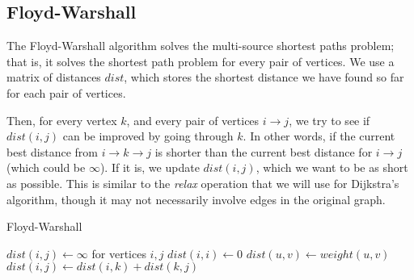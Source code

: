 \begin{center}
\end{center}


\subsection{Floyd-Warshall}

The Floyd-Warshall algorithm solves the multi-source shortest paths problem; that is, it solves the shortest path problem for every pair of vertices. We use a matrix of distances $dist$, which stores the shortest distance we have found so far for each pair of vertices.

Then, for every vertex $k$, and every pair of vertices $i \rightarrow j$, we try to see if $dist(i,j)$ can be improved by going through $k$. In other words, if the current best distance from $i \rightarrow k \rightarrow j$ is shorter than the current best distance for $i \rightarrow j$ (which could be $\infty$). If it is, we update $dist(i,j)$, which we want to be as short as possible. This is similar to the \textit{relax} operation that we will use for Dijkstra's algorithm, though it may not necessarily involve edges in the original graph.

\begin{algorithm}[H]
\caption{Floyd-Warshall}
\begin{algorithmic}
\State $dist(i, j) \gets \infty$ for vertices $i, j$
    \State $dist(i,i) \gets 0$
\EndFor
{}
	\State $dist(u,v) \gets weight(u,v)$
\EndFor
{}
            	\State $dist(i,j) \gets dist(i,k)+dist(k,j)$
            \EndIf
        \EndFor
    \EndFor
\EndFor
\end{algorithmic}
\end{algorithm}

